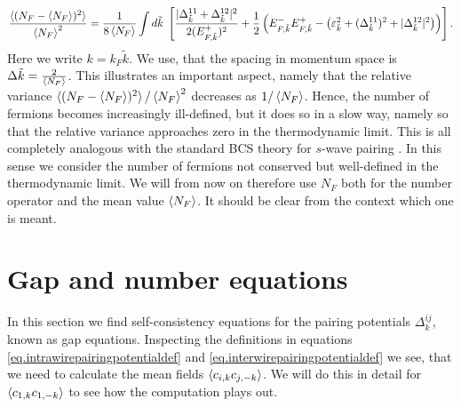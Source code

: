 \begin{equation}
\frac{\braket{(N_F - \braket{N_F})^2}}{\braket{N_F}^2} = \frac{1}{8\braket{N_F}}\int d\tilde{k} \; \left[ \frac{|\Delta^{11}_{\tilde{k}} + \Delta^{12}_{\tilde{k}}|^2}{2(E^{+}_{F,\tilde{k}})^2} + \frac{1}{2}\left(E^{-}_{F,\tilde{k}}E^{+}_{F,\tilde{k}} - \left(\varepsilon_{\tilde{k}}^2 + (\Delta^{11}_{\tilde{k}})^2 + |\Delta^{12}_{\tilde{k}}|^2\right) \right) \right]. \nonumber
\end{equation}
Here we write $k = k_F \tilde{k}$. We use, that the spacing in momentum space is $\Delta \tilde{k} = \frac{2}{\braket{N_F}}$. This illustrates an important aspect, namely that the relative variance $\braket{(N_F - \braket{N_F})^2}/\braket{N_F}^2$ decreases as $1/\braket{N_F}$. Hence, the number of fermions becomes increasingly ill-defined, but it does so in a slow way, namely so that the relative variance approaches zero in the thermodynamic limit. This is all completely analogous with the standard BCS theory for $s$-wave pairing \cite[pp. 50-52]{Tinkham}. In this sense we consider the number of fermions not conserved but well-defined in the thermodynamic limit. We will from now on therefore use $N_F$ both for the number operator and the mean value $\braket{N_F}$. It should be clear from the context which one is meant.

\section{Gap and number equations} \label{sec.gapandnumberequations}
In this section we find self-consistency equations for the pairing potentials $\Delta^{ij}_k$, known as gap equations. Inspecting the definitions in equations \eqref{eq.intrawirepairingpotentialdef} and \eqref{eq.interwirepairingpotentialdef} we see, that we need to calculate the mean fields $\braket{ c_{i, k} c_{j,-k} }$. We will do this in detail for $\braket{c_{1,k}c_{1,-k}}$ to see how the computation plays out. 

